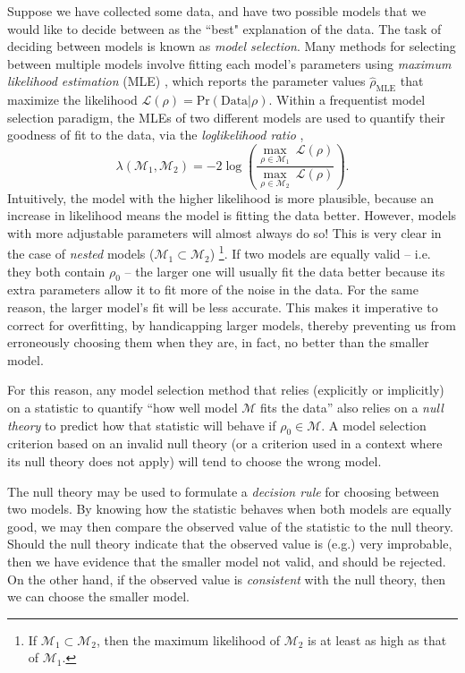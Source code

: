 \documentclass[aps,pra, twocolumn]{revtex4-1}
\newcommand{\M}{\mathcal{M}}
\newcommand{\cL}{\mathcal{L}}
\newcommand{\rhohat}{\hat{\rho}}
\newcommand{\rhoMLE}{\rhohat_{\scriptscriptstyle\mathrm{MLE}}}
\begin{document}
Suppose we have collected some data, and have two possible models that we would like to decide between as the ``best" explanation of the data. The task of deciding between models is known as \emph{model selection}. Many methods for selecting between multiple models involve fitting each model's parameters using \emph{maximum likelihood estimation} (MLE) \cite{Hradil1997, JamesPRA2001, Blume-Kohout2010}, which reports the parameter values $\rhoMLE$ that maximize the likelihood $\mathcal{L}(\rho) = \mathrm{Pr}(\mathrm{Data}|\rho)$. Within a frequentist model selection paradigm, the MLEs of two different models are used to quantify their goodness of fit to the data, via the \emph{loglikelihood ratio} \cite{Blume-Kohout2010, Moroder2013, Neyman1933},
\begin{equation}
\lambda(\M_{1}, \M_{2}) = -2 \log \left(\frac{\underset{\rho \in \M_{1}}{\max}~\cL(\rho)}{\underset{\rho \in 
\M_{2}}{\max}~\cL(\rho)}\right).
\end{equation}
Intuitively, the model with the higher likelihood is more plausible, because an increase in likelihood means the model is fitting the data better. However, models with 
more adjustable parameters will almost always do so!  This is very clear in the case
of \emph{nested} models ($\M_{1} \subset \M_{2}$) \footnote{If $\M_{1}\subset \M_{2}$, then the maximum likelihood of $\M_{2}$ is at least as high as that of $\M_{1}$.}. If two models are equally valid -- i.e. they both contain $\rho_0$ -- the larger one will usually fit the data better because its extra parameters allow it to fit more of the noise in the data.  For the same reason, the larger model's fit will be less accurate.  This makes it imperative to correct for overfitting, by handicapping larger models, thereby preventing us from erroneously choosing them when they are, in fact, no better than the smaller model.

For this reason, any model selection method that relies (explicitly or implicitly) on a statistic to quantify ``how well model $\M$ fits the data'' also relies on a \emph{null theory} to predict how that statistic will behave if $\rho_{0} \in \M$.  A model selection criterion based on an invalid null theory (or a criterion used in a context where its null theory does not apply) will tend to choose the wrong model.

The null theory may be used to formulate a \emph{decision rule} for choosing between two models. By knowing how the statistic behaves when both models are equally good, we may then compare the observed value of the statistic to the null theory. Should the null theory indicate that the observed value is (e.g.) very improbable, then we have evidence that the smaller model not valid, and should be rejected. On the other hand, if the observed value is \emph{consistent} with the null theory, then we can choose the smaller model.
\end{document}

